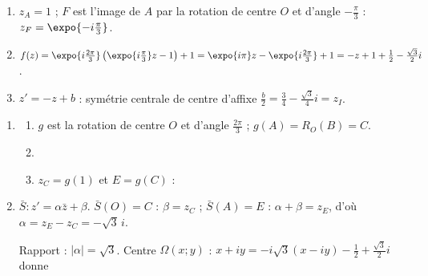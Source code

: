 \begin{description}
\begin{enumerate}
		\item {}
			$z_A = 1$ ; $F$ est l'image de $A$ par la rotation de centre $O$ et d'angle $-\frac{\pi}{3}$ : $z_F = \expo{-i\frac{\pi}{3}}$.
			\par\noindent{}
		\item {}
			\par\noindent{}
			$f(z) = \expo{i\frac{2\pi}{3}}\left(\expo{i\frac{\pi}{3}}z - 1\right) + 1 = \expo{i\pi}z - \expo{i\frac{2\pi}{3}} + 1 = -z + 1 + \frac{1}{2} - \frac{\sqrt{3}}{2}i$.
			\par\noindent{}
		\item {}
			$z' = -z + b$ : symétrie centrale de centre d'affixe $\frac{b}{2} = \frac{3}{4} - \frac{\sqrt{3}}{4}i = z_I$.
			\par\noindent{}
	\end{enumerate}
	\item[Partie C]
	\begin{enumerate}
		\item
		\begin{enumerate}
			\item {}
				$g$ est la rotation de centre $O$ et d'angle $\frac{2\pi}{3}$ ; $g(A) = R_O(B) = C$. \par\noindent{}
			\item {}
			\item {}
				$z_C = g(1)$ et $E = g(C)$ :
				\par\noindent{}
		\end{enumerate}
		\item {}
			$\bar{S} : z' = \alpha\bar{z} + \beta$. $\bar{S}(O) = C$ : $\beta = z_C$ ; $\bar{S}(A) = E$ : $\alpha + \beta = z_E$, d'où $\alpha = z_E - z_C = -\sqrt{3}\,i$.
			\par\noindent{}
			Rapport : $|\alpha| = \sqrt{3}$. Centre $\Omega(x;y)$ : $x + iy = -i\sqrt{3}(x - iy) - \frac{1}{2} + \frac{\sqrt{3}}{2}i$ donne

\end{enumerate}
\end{description}

